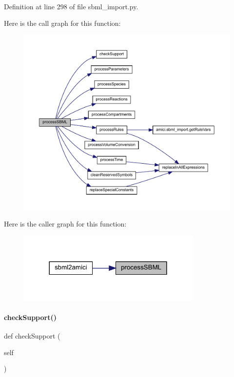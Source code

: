 Definition at line 298 of file sbml\+\_\+import.\+py.

Here is the call graph for this function\+:
\nopagebreak
\begin{figure}[H]
\begin{center}
\leavevmode
\includegraphics[width=350pt]{classamici_1_1sbml__import_1_1_sbml_importer_ac188693ab1d9fc500d55748dbde9bf89_cgraph}
\end{center}
\end{figure}
Here is the caller graph for this function\+:
\nopagebreak
\begin{figure}[H]
\begin{center}
\leavevmode
\includegraphics[width=260pt]{classamici_1_1sbml__import_1_1_sbml_importer_ac188693ab1d9fc500d55748dbde9bf89_icgraph}
\end{center}
\end{figure}
\mbox{\label{classamici_1_1sbml__import_1_1_sbml_importer_ae9585f937c02f0618abeb06dd48bcd54}} 
\paragraph{\texorpdfstring{checkSupport()}{checkSupport()}}
{\footnotesize\ttfamily def check\+Support (\begin{DoxyParamCaption}\item[{}]{self }\end{DoxyParamCaption})}


